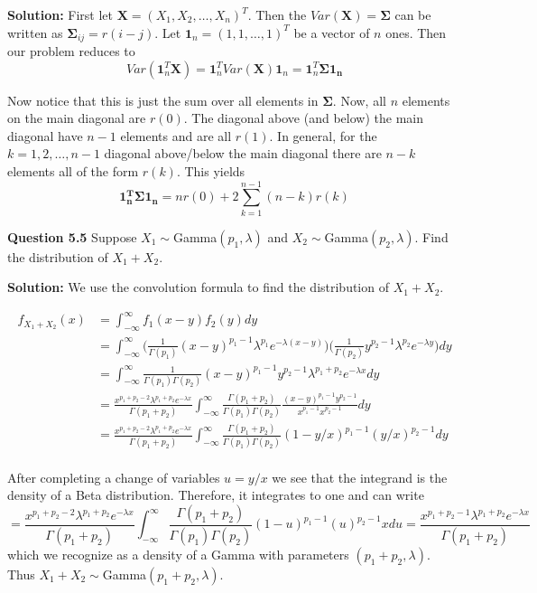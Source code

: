 \documentclass[12pt]{article}  %
\begin{document}
\textbf{Solution:} First let $\mathbf{X} = (X_1, X_2,\ldots, X_n)^T$. Then the $Var(\mathbf{X}) = \mathbf{\Sigma}$ can be written as $\mathbf{\Sigma}_{ij} = r(i-j)$. Let $\mathbf{1}_{n} = (1,1,\ldots,1)^T$ be a vector of $n$ ones. Then our problem reduces to $$Var(\mathbf{1}_n^T\mathbf{X}) = \mathbf{1}_n^{T}Var(\mathbf{X})\mathbf{1}_n = \mathbf{1}_n^{T}\mathbf{\Sigma 1_n}$$

Now notice that this is just the sum over all elements in $\mathbf{\Sigma}$. Now, all $n$ elements on the main diagonal are $r(0)$. The diagonal above (and below) the main diagonal have $n-1$ elements and are all $r(1)$. In general, for the $k = 1, 2, \ldots, n-1$ diagonal above/below the main diagonal there are $n-k$ elements all of the form $r(k)$. This yields $$\mathbf{1_n^T\Sigma1_n} = nr(0) + 2\sum_{k = 1}^{n-1}(n-k)r(k)$$

\newpage

\textbf{Question 5.5}
Suppose $X_1\sim$Gamma$(p_1, \lambda)$ and $X_2\sim$Gamma$(p_2, \lambda)$. Find the distribution of $X_1+X_2$. 

\textbf{Solution:} We use the convolution formula to find the distribution of $X_1 + X_2$. 

\begin{align*}
f_{X_1+X_2}(x) &= \int_{-\infty}^{\infty}f_1(x-y)f_2(y)dy\\
&= \int_{-\infty}^{\infty}\Big(\frac{1}{\Gamma(p_1)}(x-y)^{p_1-1}\lambda^{p_1}e^{-\lambda(x-y)}\Big)\Big(\frac{1}{\Gamma(p_2)}y^{p_2-1}\lambda^{p_2}e^{-\lambda y}\Big)dy\\
&= \int_{-\infty}^{\infty}\frac{1}{\Gamma(p_1)\Gamma(p_2)}(x-y)^{p_1-1}y^{p_2-1}\lambda^{p_1+p_2}e^{-\lambda x}dy\\
&= \frac{x^{p_1+p_2 - 2}\lambda^{p_1+p_2}e^{-\lambda x}}{\Gamma(p_1+p_2)}\int_{-\infty}^{\infty}\frac{\Gamma(p_1+p_2)}{\Gamma(p_1)\Gamma(p_2)}\frac{(x-y)^{p_1-1}y^{p_2-1}}{x^{p_1-1}x^{p_2-1}}dy\\
&= \frac{x^{p_1+p_2 - 2}\lambda^{p_1+p_2}e^{-\lambda x}}{\Gamma(p_1+p_2)}\int_{-\infty}^{\infty}\frac{\Gamma(p_1+p_2)}{\Gamma(p_1)\Gamma(p_2)}(1-y/x)^{p_1-1}(y/x)^{p_2-1}dy\\
\end{align*}

After completing a change of variables $u = y/x$ we see that the integrand is the density of a Beta distribution. Therefore, it integrates to one and can write $$= \frac{x^{p_1+p_2-2}\lambda^{p_1+p_2}e^{-\lambda x}}{\Gamma(p_1+p_2)}\int_{-\infty}^{\infty}\frac{\Gamma(p_1+p_2)}{\Gamma(p_1)\Gamma(p_2)}(1-u)^{p_1-1}(u)^{p_2-1}xdu = \frac{x^{p_1+p_2-1}\lambda^{p_1+p_2}e^{-\lambda x}}{\Gamma(p_1+p_2)}$$ which we recognize as a density of a Gamma with parameters $(p_1+p_2,\lambda)$. Thus $X_1+X_2\sim $Gamma$(p_1+p_2, \lambda)$. 
\end{document}

